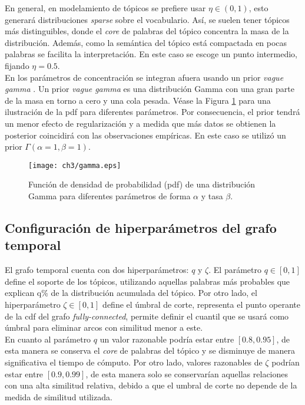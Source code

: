 En general, en modelamiento de tópicos se prefiere usar $\eta\in (0,1)$, esto generará distribuciones \textit{sparse} sobre el vocabulario. Así, se suelen tener tópicos más distinguibles, donde el \textit{core} de palabras del tópico concentra la masa de la distribución. Además, como la semántica del tópico está compactada en pocas palabras se facilita la interpretación. En este caso se escoge un punto intermedio, fijando $\eta=0.5$.\\ 

En \citep{teh2005sharing} los parámetros de concentración se integran afuera usando un prior \textit{vague gamma} \citep{escobar1995bayesian}. Un prior \textit{vague gamma} es una distribución Gamma con una gran parte de la masa en torno a cero y una cola pesada. Véase la Figura \ref{img:gamma} para una ilustración de la pdf para diferentes parámetros. Por consecuencia, el prior tendrá un menor efecto de regularización y a medida que más datos se obtienen la posterior coincidirá con las observaciones empíricas. En este caso se utilizó un prior $\Gamma(\alpha=1, \beta=1)$.

\begin{figure}
    \texttt{[image: ch3/gamma.eps]}
    \caption{Función de densidad de probabilidad (pdf) de una distribución Gamma para diferentes parámetros de forma $\alpha$ y tasa $\beta$.}
    \label{img:gamma}
\end{figure}

\subsection{Configuración de hiperparámetros del grafo temporal}
\label{sec:graph_hiperparameters}

El grafo temporal cuenta con dos hiperparámetros: $q$ y $\zeta$. El parámetro $q \in [0,1]$ define el soporte de los tópicos, utilizando aquellas palabras más probables que explican q\% de la distribución acumulada del tópico. Por otro lado, el hiperparámetro $\zeta\in[0,1]$ define el úmbral de corte, representa el punto operante de la cdf del grafo \textit{fully-connected}, permite definir el cuantil que se usará como úmbral para eliminar arcos con similitud menor a este.\\

En cuanto al parámetro $q$ un valor razonable podría estar entre $[0.8, 0.95]$, de esta manera se conserva el \textit{core} de palabras del tópico y se disminuye de manera significativa el tiempo de cómputo. Por otro lado, valores razonables de $\zeta$ podrían estar entre $[0.9, 0.99]$, de esta manera solo se conservarían aquellas relaciones con una alta similitud relativa, debido a que el umbral de corte no depende de la medida de similitud utilizada.


